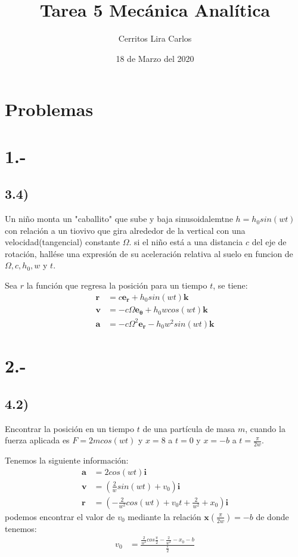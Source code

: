 \documentclass{article}
\title{Tarea 5 Mecánica Analítica}
\author{Cerritos Lira Carlos}
\date{18 de Marzo del 2020}
\begin{document}
\maketitle
\section*{Problemas}
\section*{1.-}
\subsection*{3.4)}
Un niño monta un "caballito" que sube y baja sinusoidalemtne $h=h_0sin(wt)$ con 
relación a un tiovivo que gira alrededor de la vertical con una velocidad(tangencial)
constante $\Omega$. si el niño está a una distancia $c$ del eje de rotación, 
hallése una expresión de su aceleración relativa al suelo en funcion de $\Omega, c, h_0, w$ 
y $t$. 
\begin{tcolorbox}[breakable]
    Sea $r$ la función que regresa la posición para un tiempo $t$, se tiene:
    \begin{align*}
        \bm{r} &= c\bm{e_r} + h_0sin(wt)\bm{k} \\
        \bm{v} &= -c\Omega\bm{e_\theta} + h_0wcos(wt)\bm{k} \\
        \bm{a} &= -c\Omega^2\bm{e_r} - h_0w^2sin(wt)\bm{k} 
    \end{align*}
\end{tcolorbox}

\section*{2.-}
\subsection*{4.2)}
Encontrar la posición en un tiempo $t$ de una partícula de masa $m$, cuando la fuerza aplicada
es $F=2mcos(wt)$ y $x=8$ a $t=0$ y $x=-b$ a $t=\frac{\pi}{2w}$.
\begin{tcolorbox}[breakable]
    Tenemos la siguiente información:
    \begin{align*}
        \bm{a} &= 2cos(wt) \bm{i} \\
        \bm{v} &= \left(\frac{2}{w}sin(wt) + v_0 \right)\bm{i} \\ 
        \bm{r} &= \left(-\frac{2}{w^2}cos(wt) + v_0t + \frac{2}{w^2} + x_0 \right) \bm{i}
    \end{align*}
    podemos encontrar el valor de $v_0$ mediante la relación $\bm{x}(\frac{\pi}{2w}) = -b$
    de donde tenemos:
    \begin{align*}
        v_0 &= \frac{\frac{2}{w^2}cos\frac{\pi}{2} - \frac{2}{w^2} - x_0 - b}{\frac{\pi}{2}}
    \end{align*}
\end{tcolorbox}
\end{document}
